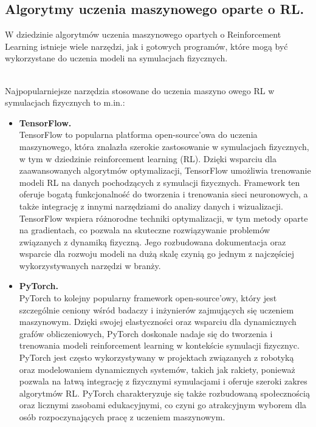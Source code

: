 \subsection{Algorytmy uczenia maszynowego oparte o RL.}

W dziedzinie algorytmów uczenia maszynowego opartych o Reinforcement
Learning istnieje wiele narzędzi, jak i gotowych programów, które mogą być
wykorzystane do
uczenia modeli na symulacjach fizycznych.

\\

Najpopularniejsze narzędzia stosowane do uczenia maszyno owego RL w
symulacjach fizycznych to m.in.:


\begin{itemize}
    \item \textbf{TensorFlow.} \\
    TensorFlow to popularna platforma open-source'owa do uczenia maszynowego, która znalazła szerokie zastosowanie w symulacjach fizycznych, w tym w dziedzinie reinforcement learning (RL). Dzięki wsparciu dla zaawansowanych algorytmów optymalizacji, TensorFlow umożliwia trenowanie modeli RL na danych pochodzących z symulacji fizycznych. Framework ten oferuje bogatą funkcjonalność do tworzenia i trenowania sieci neuronowych, a także integrację z innymi narzędziami do analizy danych i wizualizacji. TensorFlow wspiera różnorodne techniki optymalizacji, w tym metody oparte na gradientach, co pozwala na skuteczne rozwiązywanie problemów związanych z dynamiką fizyczną. Jego rozbudowana dokumentacja oraz wsparcie dla rozwoju modeli na dużą skalę czynią go jednym z najczęściej wykorzystywanych narzędzi w branży.

    \item \textbf{PyTorch.} \\
    PyTorch to kolejny popularny framework open-source'owy, który jest szczególnie ceniony wśród badaczy i inżynierów zajmujących się uczeniem maszynowym. Dzięki swojej elastyczności oraz wsparciu dla dynamicznych grafów obliczeniowych, PyTorch doskonale nadaje się do tworzenia i trenowania modeli reinforcement learning w kontekście symulacji fizycznyc. PyTorch jest często wykorzystywany w projektach związanych z robotyką oraz modelowaniem dynamicznych systemów, takich jak rakiety, ponieważ pozwala na łatwą integrację z fizycznymi symulacjami i oferuje szeroki zakres algorytmów RL. PyTorch charakteryzuje się także rozbudowaną społecznością oraz licznymi zasobami edukacyjnymi, co czyni go atrakcyjnym wyborem dla osób rozpoczynających pracę z uczeniem maszynowym.


\end{itemize}
